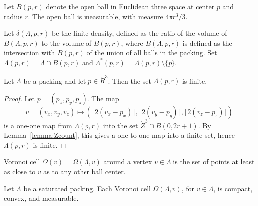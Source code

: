 


  Let $B(p,r)$ denote the open ball in
Euclidean three space at center $p$ and radius $r$.  The open ball
is measurable, with measure $4\pi r^3/3$.



Let $\delta(\Lambda,p,r)$ be the finite density, defined as the
ratio of the volume of $B(\Lambda,p,r)$ to the volume of $B(p,r)$,
where $B(\Lambda,p,r)$ is defined as the intersection with
$B(p,r)$ of the union of all balls in the packing. Set
$\Lambda(p,r) = \Lambda \cap
B(p,r)$ and $\Lambda^*(p,r) = \Lambda(p,r)\setminus \{p\}$.

\begin{lemma}
\label{lemma:Lambda-finite}
Let $\Lambda$ be a packing and let $p\in\ring{R}^3$.
Then the set $\Lambda(p,r)$ is finite.
\end{lemma}

\begin{proof}  Let $p = (p_x,p_y,p_z)$. The map
$$v=(v_x,v_y,v_z)\mapsto (\lfloor 2(v_x-p_x)
\rfloor, \lfloor 2(v_y-p_y) \rfloor, \lfloor 2(v_z-p_z) \rfloor)$$
is a one-one map from $\Lambda(p,r)$ into the set $\ring{Z}^3\cap B(0,2
r
 + 1)$.  By Lemma~\ref{lemma:Zcount}, this gives a one-to-one map
 into a finite set, hence $\Lambda(p,r)$ is finite.
\end{proof}


\begin{definition}\label{def:voronoi}
 Voronoi cell
$\Omega(v)=\Omega(\Lambda,v)$ around a
vertex $v\in \Lambda$ is the set of points at least as close to $v$ as to
any other ball center. 
\end{definition}

\begin{lemma}
Let $\Lambda$ be a saturated packing.
Each Voronoi cell $\Omega(\Lambda,v)$, for $v\in\Lambda$, is
compact, convex, and measurable.
\end{lemma}

